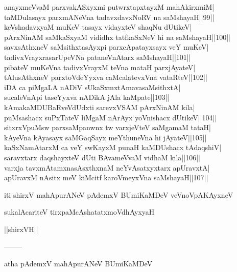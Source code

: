 \documentclass{article}
\begin{document}
anayxmeVvaM parxvakASxyxmi putwrxtapxtayxM mahAkirxmiM|\\
taMDulasayx parxmANeVna tadavxdavxNoRV na saMshayaH||99||\\
keVshadavxyaM muKeV tasayx vidayxteV shaqNu dUtikeV|\\
pArxNinAM saMkaSxyaM vididhx tatfkaSxNeV hi na saMshayaH||100||\\
savxsAthxneV saMsithxtasAyxpi parxcApatayxsayx veY muKeV|\\
tadivxVrayxrasarUpeVNa pataneVnAtarx saMshayaH||101||\\
pibateV muKeVna tadivxVrayxM teVna mataH parxjAyateV|\\
tAlusAthxneV parxtoVdeYyxva caMcalatevxVna vataRteV||102||\\
iDA ca piMgaLA nADiV sUkaSxmxtAmavasaMsithxtA|\\
sucaleVnApi taseYyxva nADikA jAla kaMpate||103||\\
kAmakaMDUBaRveVdUdxti sarevxVSAM pArxNinAM kila|\\
puMsashacx suPxTateV liMgaM nArAyx yoVnishacx dUtikeV||104||\\
sitxrxVpuMsw parxsaMpanwnx tw varxjeVteV saMgamaM tataH|\\
kAyeVna kAyasayx saMGaqSayx meYthuneVna hi jAyateV||105||\\
kaSxNamAtarxM ca veY swKayxM punaH kaMDUshacx tAdaqshiV|\\
saravxtarx daqshayxteV dUti BAvameVvaM vidhaM kila||106||\\
varxja tavxmAtamxnasAsxthxnaM neYvAsatxyxtarx apUravxtA|\\
apUravxM nAsitx meV kiMcitf karoVmeyxVna saMshayaH||107||

\begin{center}
iti shirxV mahApurANeV pAdemxV BUmiKaMDeV veVnoVpAKAyxneV
\end{center}

\begin{center}
sukalAcariteV tirxpaMcAshatatxmoVdhAyxyaH
\end{center}

\begin{center}
||shirxVH||
\end{center}

\begin{center}
--------
\end{center}

\begin{center}
atha pAdemxV mahApurANeV BUmiKaMDeV
\end{center}
\end{document}
